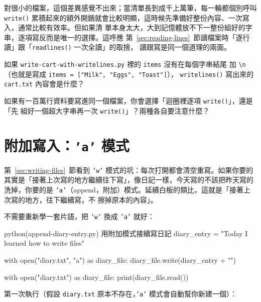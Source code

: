 對很小的檔案，這個差異感覺不出來；當清單長到成千上萬筆，每一輪都個別呼叫 \texttt{write()}
累積起來的額外開銷就會比較明顯，這時候先準備好整份內容、一次寫入，通常比較有效率。但如果清
單本身太大，大到記憶體放不下一整份組好的字串，逐項寫反而是唯一的選擇。這呼應
第~\ref{sec:reading-lines}~節讀檔案時「逐行讀」跟「\texttt{readlines()} 一次全讀」的取捨，
讀跟寫是同一個道理的兩面。


\begin{drills}[label=drills:writing-styles]
\item 如果 \texttt{write-cart-with-writelines.py} 裡的 \texttt{items} 沒有在每個字串結尾
加 \texttt{\textbackslash n}（也就是寫成 \texttt{items = ["Milk", "Eggs", "Toast"]}），
\texttt{writelines()} 寫出來的 \texttt{cart.txt} 內容會是什麼？
\item 如果有一百萬行資料要寫進同一個檔案，你會選擇「迴圈裡逐項 \texttt{write()}」，還是「先
組好一個超大字串再一次 \texttt{write()}」？兩種各自要注意什麼？
\end{drills}

\section{附加寫入：\texttt{'a'} 模式}
\label{sec:appending-files}

第~\ref{sec:writing-files}~節看到 \texttt{'w'} 模式的坑：每次打開都會清空重寫。如果你要的
其實是「接著上次寫的地方繼續往下寫」，像日記一樣，今天寫的不該把昨天寫的洗掉，你要的是
\texttt{'a'}（append，附加）模式。延續白板的類比，這就是「接著上次寫的地方，往下繼續寫，不
擦掉原本的內容」。

不需要重新學一套片語，把 \texttt{'w'} 換成 \texttt{'a'} 就好：

\begin{example}{python}{(append-diary-entry.py) 用附加模式接續寫日記}
diary_entry = "Today I learned how to write files"

with open("diary.txt", "a") as diary_file:
    diary_file.write(diary_entry + "\n")

with open("diary.txt") as diary_file:
    print(diary_file.read())
\end{example}

第一次執行（假設 \texttt{diary.txt} 原本不存在，\texttt{'a'} 模式會自動幫你新建一個）：


